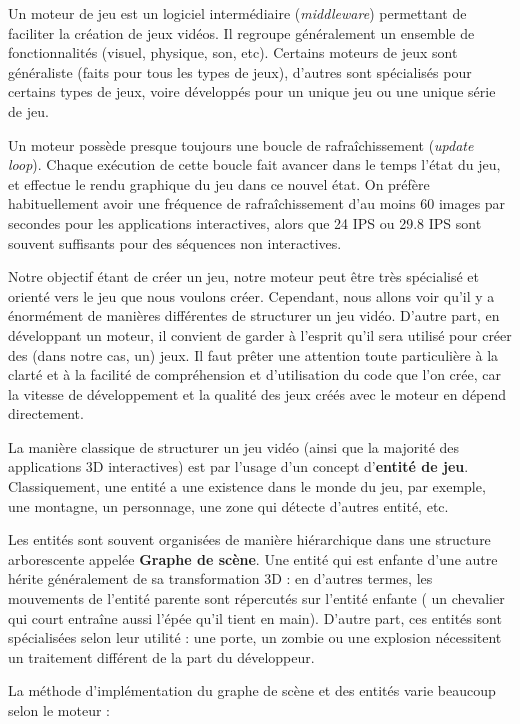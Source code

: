     Un moteur de jeu est un logiciel intermédiaire (\textit{middleware}) permettant de faciliter la création de jeux vidéos. Il regroupe généralement un ensemble de fonctionnalités (visuel, physique, son, etc). Certains moteurs de jeux sont généraliste (faits pour tous les types de jeux), d'autres sont spécialisés pour certains types de jeux, voire développés pour un unique jeu ou une unique série de jeu.

    Un moteur possède presque toujours une boucle de rafraîchissement (\textit{update loop}). Chaque exécution de cette boucle fait avancer dans le temps l'état du jeu, et effectue le rendu graphique du jeu dans ce nouvel état. On préfère habituellement avoir une fréquence de rafraîchissement d'au moins 60 images par secondes pour les applications interactives, alors que 24 IPS ou 29.8 IPS sont souvent suffisants pour des séquences non interactives.

    Notre objectif étant de créer un jeu, notre moteur peut être très spécialisé et orienté vers le jeu que nous voulons créer. Cependant, nous allons voir qu'il y a énormément de manières différentes de structurer un jeu vidéo. D'autre part, en développant un moteur, il convient de garder à l'esprit qu'il sera utilisé pour créer des (dans notre cas, un) jeux. Il faut prêter une attention toute particulière à la clarté et à la facilité de compréhension et d'utilisation du code que l'on crée, car la vitesse de développement et la qualité des jeux créés avec le moteur en dépend directement.

    La manière classique de structurer un jeu vidéo (ainsi que la majorité des applications 3D interactives) est par l'usage d'un concept d'\textbf{entité de jeu}. Classiquement, une entité a une existence dans le monde du jeu, par exemple, une montagne, un personnage, une zone qui détecte d'autres entité, etc.
    
    Les entités sont souvent organisées de manière hiérarchique dans une structure arborescente appelée \textbf{Graphe de scène}. Une entité qui est enfante d'une autre hérite généralement de sa transformation 3D : en d'autres termes, les mouvements de l'entité parente sont répercutés sur l'entité enfante ( un chevalier qui court entraîne aussi l'épée qu'il tient en main). D'autre part, ces entités sont spécialisées selon leur utilité : une porte, un zombie ou une explosion nécessitent un traitement différent de la part du développeur.
    
    La méthode d'implémentation du graphe de scène et des entités varie beaucoup selon le moteur :

